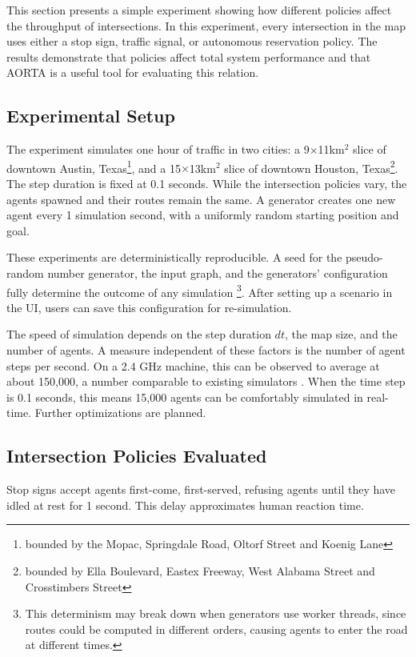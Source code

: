 \documentclass[letterpaper, 10 pt, conference]{ieeeconf}  %
\begin{document}
This section presents a simple experiment showing how different policies affect
the throughput of intersections. In this experiment, every intersection in the
map uses either a stop sign, traffic signal, or autonomous reservation policy.
The results demonstrate that policies affect total system performance and that
AORTA is a useful tool for evaluating this relation.

\subsection{Experimental Setup}

The experiment simulates one hour of traffic in two cities: a
9$\times$11km$^{2}$ slice of downtown Austin, Texas\footnote{bounded by the
Mopac, Springdale Road, Oltorf Street and Koenig Lane}, and a
15$\times$13km$^{2}$ slice of downtown Houston, Texas\footnote{bounded by Ella
Boulevard, Eastex Freeway, West Alabama Street and Crosstimbers Street}.  The
step duration is fixed at 0.1 seconds. While the intersection policies vary,
the agents spawned and their routes remain the same.  A generator creates one
new agent every 1 simulation second, with a uniformly random starting position
and goal.

These experiments are deterministically reproducible. A seed for the
pseudo-random number generator, the input graph, and the generators'
configuration fully determine the outcome of any simulation \footnote{This
determinism may break down when generators use worker threads, since routes
could be computed in different orders, causing agents to enter the road at
different times.}. After setting up a scenario in the UI, users can save this
configuration for re-simulation.

The speed of simulation depends on the step duration $dt$, the map size, and the
number of agents. A measure independent of these factors is the number of agent
steps per second. On a 2.4 GHz machine, this can be observed to average at
about 150,000, a number comparable to existing simulators \cite{SUMOthesis}.
When the time step is 0.1 seconds, this means 15,000 agents can be comfortably
simulated in real-time. Further optimizations are planned.

\subsection{Intersection Policies Evaluated}

Stop signs accept agents first-come, first-served, refusing agents until they
have idled at rest for 1 second. This delay approximates human reaction time.
\end{document}
